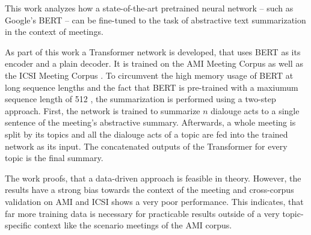 This work analyzes how a state-of-the-art pretrained neural network -- such as Google's BERT \cite{devlin2018bert} -- can be fine-tuned to the task of abstractive text summarization in the context of meetings.

As part of this work a Transformer network \cite{1706.03762} is developed, that uses BERT as its encoder and a plain decoder.
It is trained on the AMI Meeting Corpus \cite{Mccowan05theami} as well as the ICSI Meeting Corpus \cite{Janin}.
To circumvent the high memory usage of BERT at long sequence lengths and the fact that BERT is pre-trained with a maxiumum sequence length of 512 \cite[p.~13]{devlin2018bert}, the summarization is performed using a two-step approach.
First, the network is trained to summarize \(n\) dialouge acts to a single sentence of the meeting's abstractive summary.
Afterwards, a whole meeting is split by its topics and all the dialouge acts of a topic are fed into the trained network as its input.
The concatenated outputs of the Transformer for every topic is the final summary.

The work proofs, that a data-driven approach is feasible in theory.
However, the results have a strong bias towards the context of the meeting and cross-corpus validation on AMI and ICSI shows a very poor performance.
This indicates, that far more training data is necessary for practicable results outside of a very topic-specific context like the scenario meetings of the AMI corpus. 